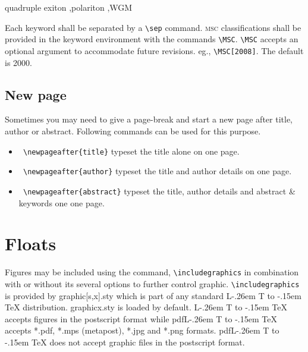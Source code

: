 \documentclass[a4paper,12pt]{article}
\makeatletter
\def\file#1{\textsf{#1}\xspace}
\DeclareRobustCommand{\LaTeX}{L\kern-.26em%
        {\sbox\z@ T%
         \vbox to\ht\z@{\hbox{\check@mathfonts
           \fontsize\sf@size\z@
           \math@fontsfalse\selectfont
          A\,}%
         \vss}%
        }%
     \kern-.15em%
    \TeX}
\makeatother
\begin{document}
\begin{vquote}
 \begin{abstract}
  In this work we demonstrate the formation of a new type of
  polariton on the interface between a ....
 \end{abstract}
\end{vquote}

\vspace*{-.5pc}
\begin{vquote}
 \begin{keyword}
  quadruple exiton \sep polariton \sep WGM
 \end{keyword}
\end{vquote}

\noindent Each keyword shall be separated by a \verb+\sep+ command.
\textsc{msc} classifications shall be provided in
the keyword environment with the commands
\verb+\MSC+. \verb+\MSC+ accepts an optional
argument to accommodate future revisions.
eg., \verb=\MSC[2008]=. The default is 2000.

\subsection{New page}
Sometimes you may need to give a page-break and start a new page after
title, author or abstract. Following commands can be used for this
purpose.

\begin{vquote}
\end{vquote}


\begin{itemize}
\leftskip-2pc
\item [] {\tt\color{verbcolor} \verb+\newpageafter{title}+} typeset the title alone on one page.

\item [] {\tt\color{verbcolor} \verb+\newpageafter{author}+}  typeset the title
and author details on one page.

\item [] {\tt\color{verbcolor} \verb+\newpageafter{abstract}+}
typeset the title,
author details and abstract \& keywords one one page.

\end{itemize}

\section{Floats}
{Figures} may be included using the command, \verb+\includegraphics+ in
combination with or without its several options to further control
graphic. \verb+\includegraphics+ is provided by \file{graphic[s,x].sty}
which is part of any standard \LaTeX{} distribution.
\file{graphicx.sty} is loaded by default. \LaTeX{} accepts figures in
the postscript format while pdf\LaTeX{} accepts \file{*.pdf},
\file{*.mps} (metapost), \file{*.jpg} and \file{*.png} formats.
pdf\LaTeX{} does not accept graphic files in the postscript format.
\end{document}
